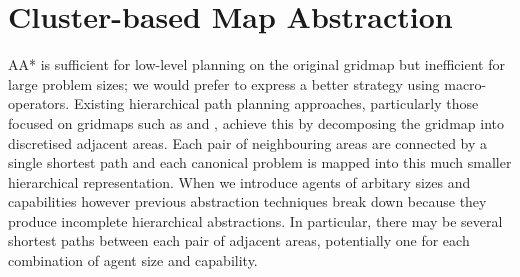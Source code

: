 \section{Cluster-based Map Abstraction}
\label{aha:mapabstraction}
AA* is sufficient for low-level planning on the original gridmap but inefficient for large problem sizes; we would prefer to express a better strategy using macro-operators.
Existing hierarchical path planning approaches, particularly those focused on gridmaps such as \cite{botea04} and \cite{sturtevant05}, achieve this by decomposing the gridmap into discretised adjacent areas. 
Each pair of neighbouring areas are connected by a single shortest path and each canonical problem is mapped into this much smaller hierarchical representation.
When we introduce agents of arbitary sizes and capabilities however previous abstraction techniques break down because they produce incomplete hierarchical abstractions. 
In particular, there may be several shortest paths between each pair of adjacent areas, potentially one for each combination of agent size and capability.
